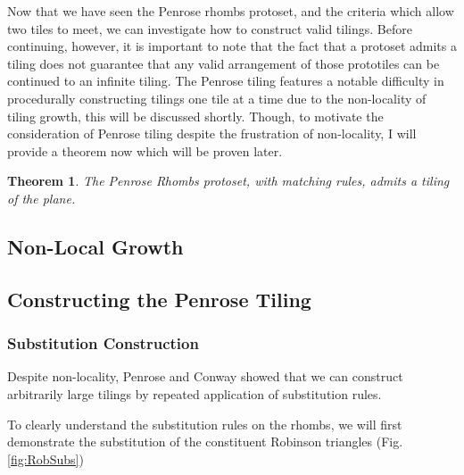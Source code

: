 \documentclass[]{article}
\newtheorem{mythm}{Theorem}
\begin{document}
Now that we have seen the Penrose rhombs protoset, and the criteria which allow two tiles to meet, we can investigate how to construct valid tilings. Before continuing, however, it is important to note that the fact that a protoset admits a tiling does not guarantee that any valid arrangement of those prototiles can be continued to an infinite tiling. The Penrose tiling features a notable difficulty in procedurally constructing tilings one tile at a time due to the non-locality of tiling growth, this will be discussed shortly. Though, to motivate the consideration of Penrose tiling despite the frustration of non-locality, I will provide a theorem now which will be proven later.

\begin{mythm}
The Penrose Rhombs protoset, with matching rules, admits a tiling of the plane.
\end{mythm}

\subsection{Non-Local Growth}
\subsection{Constructing the Penrose Tiling}
\subsubsection{Substitution Construction}
Despite non-locality, Penrose and Conway showed that we can construct arbitrarily large tilings by repeated application of substitution rules.

To clearly understand the substitution rules on the rhombs, we will first demonstrate the substitution of the constituent Robinson triangles (Fig.\ref{fig:RobSubs})
\end{document}
